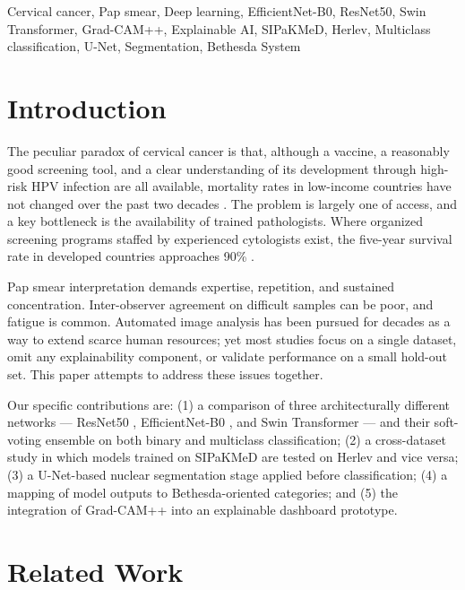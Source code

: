 \documentclass[conference]{IEEEtran}
\begin{document}
\begin{IEEEkeywords}
Cervical cancer, Pap smear, Deep learning, EfficientNet-B0, ResNet50, Swin Transformer, Grad-CAM++, Explainable AI, SIPaKMeD, Herlev, Multiclass classification, U-Net, Segmentation, Bethesda System
\end{IEEEkeywords}

\section{Introduction}

The peculiar paradox of cervical cancer is that, although a vaccine, a reasonably good screening tool, and a clear understanding of its development through high-risk HPV infection are all available, mortality rates in low-income countries have not changed over the past two decades \cite{who2022}. The problem is largely one of access, and a key bottleneck is the availability of trained pathologists. Where organized screening programs staffed by experienced cytologists exist, the five-year survival rate in developed countries approaches 90\% \cite{arbyn2010}.

Pap smear interpretation demands expertise, repetition, and sustained concentration. Inter-observer agreement on difficult samples can be poor, and fatigue is common. Automated image analysis has been pursued for decades as a way to extend scarce human resources; yet most studies focus on a single dataset, omit any explainability component, or validate performance on a small hold-out set. This paper attempts to address these issues together.

Our specific contributions are: (1) a comparison of three architecturally different networks --- ResNet50 \cite{he2016deep}, EfficientNet-B0 \cite{tan2019efficientnet}, and Swin Transformer \cite{liu2021swin} --- and their soft-voting ensemble on both binary and multiclass classification; (2) a cross-dataset study in which models trained on SIPaKMeD \cite{plissiti2018sipakmed} are tested on Herlev \cite{jantzen2005} and vice versa; (3) a U-Net-based nuclear segmentation stage applied before classification; (4) a mapping of model outputs to Bethesda-oriented categories; and (5) the integration of Grad-CAM++ \cite{chattopadhay2018} into an explainable dashboard prototype.

\section{Related Work}
\end{document}
